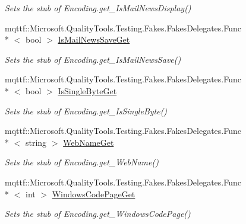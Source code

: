 \begin{DoxyCompactItemize}
\begin{DoxyCompactList}\small\item\em Sets the stub of Encoding.\-get\-\_\-\-Is\-Mail\-News\-Display()\end{DoxyCompactList}\item 
mqttf\-::\-Microsoft.\-Quality\-Tools.\-Testing.\-Fakes.\-Fakes\-Delegates.\-Func\\*
$<$ bool $>$ \hyperlink{class_system_1_1_text_1_1_fakes_1_1_stub_unicode_encoding_ab289762f74622f99d0d97b8de6bd2edc}{Is\-Mail\-News\-Save\-Get}
\begin{DoxyCompactList}\small\item\em Sets the stub of Encoding.\-get\-\_\-\-Is\-Mail\-News\-Save()\end{DoxyCompactList}\item 
mqttf\-::\-Microsoft.\-Quality\-Tools.\-Testing.\-Fakes.\-Fakes\-Delegates.\-Func\\*
$<$ bool $>$ \hyperlink{class_system_1_1_text_1_1_fakes_1_1_stub_unicode_encoding_a623e82d0f89c13affb7ce2004f43473c}{Is\-Single\-Byte\-Get}
\begin{DoxyCompactList}\small\item\em Sets the stub of Encoding.\-get\-\_\-\-Is\-Single\-Byte()\end{DoxyCompactList}\item 
mqttf\-::\-Microsoft.\-Quality\-Tools.\-Testing.\-Fakes.\-Fakes\-Delegates.\-Func\\*
$<$ string $>$ \hyperlink{class_system_1_1_text_1_1_fakes_1_1_stub_unicode_encoding_af27c104e52977c77c7042de2599eab38}{Web\-Name\-Get}
\begin{DoxyCompactList}\small\item\em Sets the stub of Encoding.\-get\-\_\-\-Web\-Name()\end{DoxyCompactList}\item 
mqttf\-::\-Microsoft.\-Quality\-Tools.\-Testing.\-Fakes.\-Fakes\-Delegates.\-Func\\*
$<$ int $>$ \hyperlink{class_system_1_1_text_1_1_fakes_1_1_stub_unicode_encoding_a51660eae2d2ea4cee4743ed950b62349}{Windows\-Code\-Page\-Get}
\begin{DoxyCompactList}\small\item\em Sets the stub of Encoding.\-get\-\_\-\-Windows\-Code\-Page()\end{DoxyCompactList}\end{DoxyCompactItemize}
